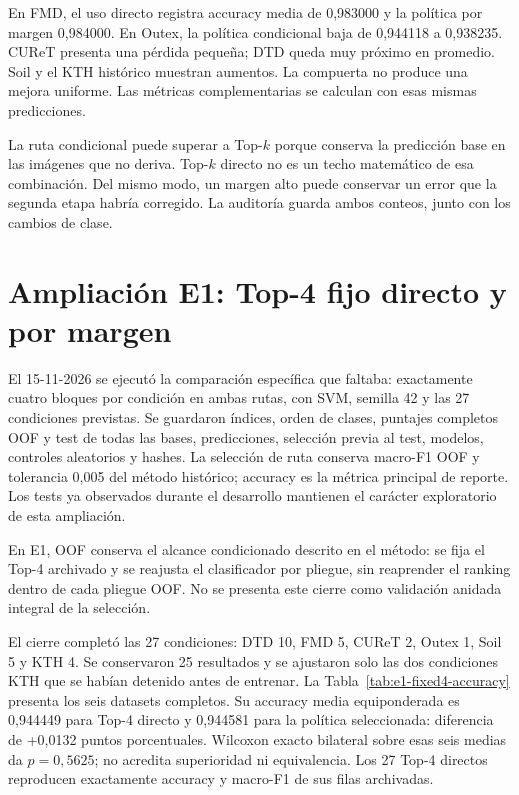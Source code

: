 En FMD, el uso directo registra accuracy media de 0,983000 y la política por margen 0,984000. En Outex, la política condicional baja de 0,944118 a 0,938235. CUReT presenta una pérdida pequeña; DTD queda muy próximo en promedio. Soil y el KTH histórico muestran aumentos. La compuerta no produce una mejora uniforme. Las métricas complementarias se calculan con esas mismas predicciones.

La ruta condicional puede superar a Top-\(k\) porque conserva la predicción base en las imágenes que no deriva. Top-\(k\) directo no es un techo matemático de esa combinación. Del mismo modo, un margen alto puede conservar un error que la segunda etapa habría corregido. La auditoría guarda ambos conteos, junto con los cambios de clase.

\section{Ampliación E1: Top-4 fijo directo y por margen}\label{sec:e1-fixed4}
El 15-11-2026 se ejecutó la comparación específica que faltaba: exactamente cuatro bloques por condición en ambas rutas, con SVM, semilla 42 y las 27 condiciones previstas. Se guardaron índices, orden de clases, puntajes completos OOF y test de todas las bases, predicciones, selección previa al test, modelos, controles aleatorios y hashes. La selección de ruta conserva macro-F1 OOF y tolerancia 0,005 del método histórico; accuracy es la métrica principal de reporte. Los tests ya observados durante el desarrollo mantienen el carácter exploratorio de esta ampliación.

En E1, OOF conserva el alcance condicionado descrito en el método: se fija el Top-4 archivado y se reajusta el clasificador por pliegue, sin reaprender el ranking dentro de cada pliegue OOF. No se presenta este cierre como validación anidada integral de la selección.

El cierre completó las 27 condiciones: DTD 10, FMD 5, CUReT 2, Outex 1, Soil 5 y KTH 4. Se conservaron 25 resultados y se ajustaron solo las dos condiciones KTH que se habían detenido antes de entrenar. La Tabla~\ref{tab:e1-fixed4-accuracy} presenta los seis datasets completos. Su accuracy media equiponderada es 0,944449 para Top-4 directo y 0,944581 para la política seleccionada: diferencia de +0,0132 puntos porcentuales. Wilcoxon exacto bilateral sobre esas seis medias da \(p=0,5625\); no acredita superioridad ni equivalencia. Los 27 Top-4 directos reproducen exactamente accuracy y macro-F1 de sus filas archivadas.

